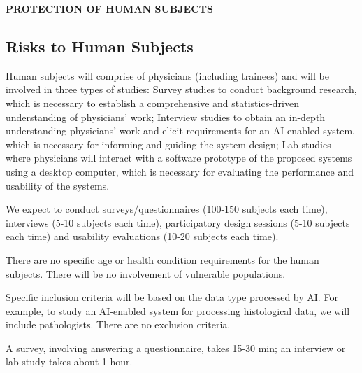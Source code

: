 
{\noindent \bf \Large PROTECTION OF HUMAN SUBJECTS}
\vspace{-1em}



\subsection*{Risks to Human Subjects}\vspace{-1em}
Human subjects will comprise of physicians (including trainees) and will be involved in three types of studies:
\one Survey studies to conduct background research, which is necessary to establish a comprehensive and statistics-driven understanding of physicians' work;
\two Interview studies to obtain an in-depth understanding physicians' work and elicit requirements for an AI-enabled system, which is necessary for informing and guiding the system design;
\three Lab studies where physicians will interact with a software prototype of the proposed systems using a desktop computer, which is necessary for evaluating the performance and usability of the systems.

We expect to conduct surveys/questionnaires (100-150 subjects each time), interviews (5-10 subjects each time), participatory design sessions (5-10 subjects each time) and usability evaluations (10-20 subjects each time).

There are no specific age or health condition requirements for the human subjects. There will be no involvement of vulnerable populations.

Specific inclusion criteria will be based on the data type processed by AI. For example, to study an AI-enabled system for processing histological data, we will include pathologists. There are no exclusion criteria.

A survey, involving answering a questionnaire, takes 15-30 min; an interview or lab study takes about 1 hour.

